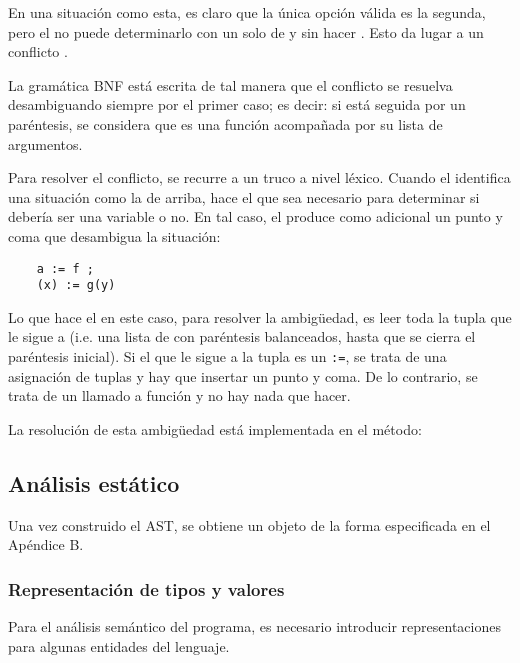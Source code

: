 \documentclass{article}
\begin{document}
En una situaci\'on como esta, es claro que la \'unica opci\'on v\'alida
es la segunda, pero el  no puede determinarlo con
un solo  de  y sin hacer .
Esto da lugar a un conflicto .

La gram\'atica BNF est\'a escrita de tal manera que
el conflicto se resuelva desambiguando siempre por
el primer caso; es decir: si  est\'a seguida
por un par\'entesis, se considera que  es una
funci\'on acompa\~nada por su lista de argumentos.

Para resolver el conflicto, se recurre a un
truco a nivel l\'exico. Cuando el  identifica una situaci\'on
como la de arriba, hace el 
que sea necesario para determinar si  deber\'ia ser
una variable o no. En tal caso, el  produce como
 adicional un punto y coma que desambigua la
situaci\'on:

\begin{verbatim}
    a := f ;
    (x) := g(y)
\end{verbatim}
Lo que hace el  en este caso, para resolver la ambig\"uedad,
es leer toda la tupla que le sigue a  (i.e. una lista de 
con par\'entesis balanceados, hasta que se cierra el par\'entesis inicial).
Si el  que le sigue a la tupla es
un \verb|:=|, se trata de una asignaci\'on de tuplas y hay
que insertar un punto y coma. De lo contrario, se trata de
un llamado a funci\'on y no hay nada que hacer.

La resoluci\'on de esta ambig\"uedad est\'a
implementada en el m\'etodo:\\


\subsection{An\'alisis est\'atico}

Una vez construido el AST, se obtiene un objeto de la forma
especificada en el Ap\'endice B.

\subsubsection{Representaci\'on de tipos y valores}

Para el an\'alisis sem\'antico del programa, es
necesario introducir representaciones para
algunas entidades del lenguaje.
\end{document}

